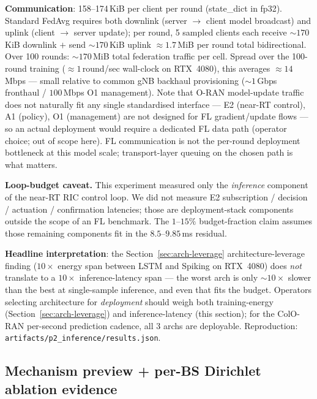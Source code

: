 \documentclass[journal]{IEEEtran}
\begin{document}
\textbf{Communication}: 158--174\,KiB per client per round (state\_dict in fp32). Standard FedAvg requires both downlink (server $\rightarrow$ client model broadcast) and uplink (client $\rightarrow$ server update); per round, 5 sampled clients each receive $\sim 170$\,KiB downlink $+$ send $\sim 170$\,KiB uplink $\approx 1.7$\,MiB per round total bidirectional. Over 100 rounds: $\sim 170$\,MiB total federation traffic per cell. Spread over the 100-round training ($\approx 1$\,round/sec wall-clock on RTX~4080), this averages $\approx 14$\,Mbps --- small relative to common gNB backhaul provisioning ($\sim 1$\,Gbps fronthaul / $100$\,Mbps O1 management). Note that O-RAN model-update traffic does not naturally fit any single standardised interface --- E2 (near-RT control), A1 (policy), O1 (management) are not designed for FL gradient/update flows --- so an actual deployment would require a dedicated FL data path (operator choice; out of scope here). FL communication is not the per-round deployment bottleneck at this model scale; transport-layer queuing on the chosen path is what matters.

\textbf{Loop-budget caveat.} This experiment measured only the \emph{inference} component of the near-RT RIC control loop. We did not measure E2 subscription / decision / actuation / confirmation latencies; those are deployment-stack components outside the scope of an FL benchmark. The $1$--$15\%$ budget-fraction claim assumes those remaining components fit in the $8.5$--$9.85$\,ms residual.

\textbf{Headline interpretation}: the Section~\ref{sec:arch-leverage} architecture-leverage finding ($10\times$ energy span between LSTM and Spiking on RTX~4080) does \emph{not} translate to a $10\times$ inference-latency span --- the worst arch is only $\sim 10\times$ slower than the best at single-sample inference, and even that fits the budget. Operators selecting architecture for \emph{deployment} should weigh both training-energy (Section~\ref{sec:arch-leverage}) and inference-latency (this section); for the ColO-RAN per-second prediction cadence, all 3 archs are deployable. Reproduction: \lstinline|artifacts/p2_inference/results.json|.

\subsection{Mechanism preview + per-BS Dirichlet ablation evidence}\label{sec:mechanism-preview}
\end{document}
